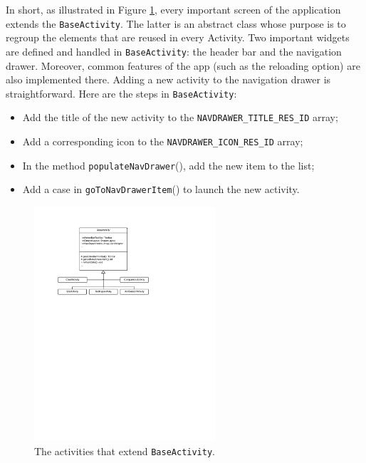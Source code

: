 \documentclass[a4paper, oneside, 11pt]{book}
\begin{document}
In short, as illustrated in Figure \ref{fig:base_activity}, every important screen of the application extends the \texttt{BaseActivity}. The latter is an abstract class whose purpose is to regroup the elements that are reused in every Activity. Two important widgets are defined and handled in \texttt{BaseActivity}: the header bar and the navigation drawer. Moreover, common features of the app (such as the reloading option) are also implemented there. Adding a new activity to the navigation drawer is straightforward. Here are the steps in \texttt{BaseActivity}:
\begin{itemize}
	\item Add the title of the new activity to the \texttt{NAVDRAWER\_TITLE\_RES\_ID} array;
	\item Add a corresponding icon to the \texttt{NAVDRAWER\_ICON\_RES\_ID} array;
	\item In the method \texttt{populateNavDrawer}(), add the new item to the list;
	\item Add a case in \texttt{goToNavDrawerItem}() to launch the new activity.
\end{itemize}

\begin{figure}[htbp]
	\centerline{\includegraphics[width=0.6\textwidth]{base_activity.pdf}}
	\caption{The activities that extend \texttt{BaseActivity}.}
	\label{fig:base_activity}
\end{figure}
\end{document}
